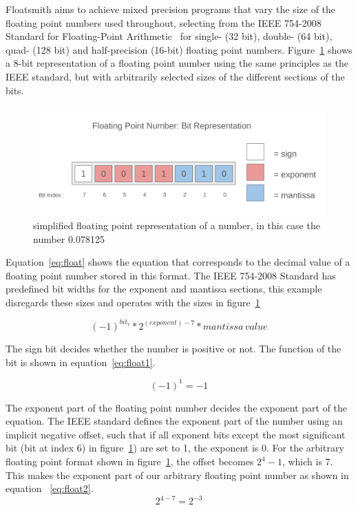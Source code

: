 Floatsmith aims to achieve mixed precision programs that vary the size of the floating point numbers used throughout, selecting from the IEEE 754-2008 Standard for Floating-Point Arithmetic~\citep{ieee754} for single- (32 bit), double- (64 bit), quad- (128 bit) and half-precision (16-bit) floating point numbers. Figure~\ref{fig:float_bit_representation} shows a 8-bit representation of a floating point number using the same principles as the IEEE standard, but with arbitrarily selected sizes of the different sections of the bits. 
\begin{figure}[h]
    \centering
    \includegraphics[width=0.5\linewidth]{Images/float_bit_representation.png}
    \caption{simplified floating point representation of a number, in this case the number 0.078125}
    \label{fig:float_bit_representation}
\end{figure}

Equation~\ref{eq:float} shows the equation that corresponds to the decimal value of a floating point number stored in this format. The IEEE 754-2008 Standard has predefined bit widths for the exponent and mantissa sections, this example disregards these sizes and operates with the sizes in figure~\ref{fig:float_bit_representation}

\begin{equation}\label{eq:float}
    (-1)^{bit_7} * 2^{(exponent) - 7} * mantissa \, value
\end{equation}

The sign bit decides whether the number is positive or not. The function of the bit is shown in equation~\ref{eq:float1}.

\begin{equation} \label{eq:float1}
    (-1)^{1} = -1
\end{equation}

The exponent part of the floating point number decides the exponent part of the equation. The IEEE standard defines the exponent part of the number using an implicit negative offset, such that if all exponent bits except the most significant bit (bit at index 6) in figure~\ref{fig:float_bit_representation}) are set to 1, the exponent is 0. For the arbitrary floating point format shown in figure~\ref{fig:float_bit_representation}, the offset becomes $2^4 - 1$, which is 7. This makes the exponent part of our arbitrary floating point number as shown in equation ~\ref{eq:float2}.
\begin{equation} \label{eq:float2}
    2^{4-7} = 2^{-3}
\end{equation}

